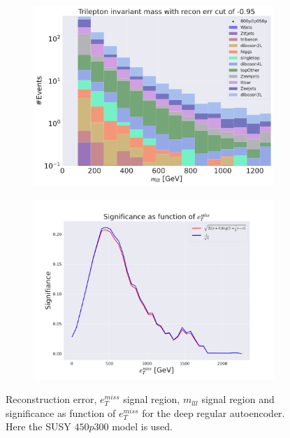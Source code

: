 \begin{figure}[H]
    \hfill
    \begin{subfigure}{.49\textwidth}
        \includegraphics[width=\textwidth]{Figures/AE_testing/big/3lep/b_data_recon_big_rm3_feats_sig_800p0p050p_mlll_recon_errcut_-0.95.pdf}
        \caption{}
        \label{fig:AE_3lep_big_mlll_800_2}
    \end{subfigure}
    \hfill   
    \begin{subfigure}{.49\textwidth}
        \includegraphics[width=\textwidth]{Figures/AE_testing/big/3lep/significance_etmiss_800p0p050p_-0.9544944422260757.pdf}
        \caption{}
        \label{fig:AE_3lep_big_signi_800_2}
    \end{subfigure}
    \hfill      
    \caption[3lep deep network | $800p50$ | AE | 2]{Reconstruction error, $e_T^{miss}$ signal region, $m_{lll}$ signal region and significance as function of 
    $e_T^{miss}$ for the deep regular autoencoder. Here the SUSY $450p300$ model is used.}
    \label{fig:AE_3lep_big_rec_sig_signi_800_2}
\end{figure}

